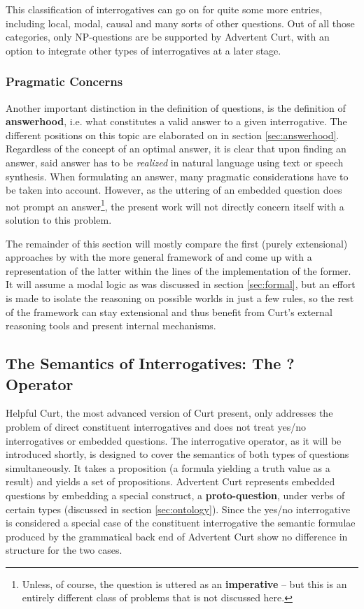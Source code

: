 \documentclass[notitlepage,twoside,a4paper]{scrreprt}
\newcommand{\term}[1]{\textsf{\textbf{#1}}} %
\newcommand{\pn}{\textsf} %
\newcommand{\curt}{\pn{Curt}}
\newcommand{\acurt}{\pn{Advertent Curt}}
\theoremstyle{remark}
\theoremstyle{remark}
\theoremstyle{definition}
\theoremstyle{definition}
\begin{document}
This classification of interrogatives can go on for quite some more entries,
including local, modal, causal and many sorts of other questions. Out of all
those categories, only NP-questions are be supported by \acurt{}, with an option to
integrate other types of interrogatives at a later stage.

\subsubsection{Pragmatic Concerns}

Another important distinction in the definition of questions, is the definition
of \term{answerhood}, i.e. what constitutes a valid answer to a given
interrogative. The different positions on this topic are elaborated on in
section \ref{sec:answerhood}. Regardless of the concept of an optimal answer, it
is clear that upon finding an answer, said answer has to be \emph{realized} in
natural language using text or speech synthesis. When formulating an answer,
many pragmatic considerations have to be taken into account.  However, as the
uttering of an embedded question does not prompt an answer\footnote{Unless, of
course, the question is uttered as an \term{imperative} -- but this is an
entirely different class of problems that is not discussed here.}, the present
work will not directly concern itself with a solution to this problem.

The remainder of this section will mostly compare the first (purely extensional)
approaches by \cite{blackburnbos:cl1} with the more general framework of
\cite{gs:q} and come up with a representation of the latter within the lines of
the implementation of the former. It will assume a modal logic as was discussed
in section \ref{sec:formal}, but an effort is made to isolate the reasoning on
possible worlds in just a few rules, so the rest of the framework can stay
extensional and thus benefit from \curt's external reasoning tools and present
internal mechanisms.

\subsection{The Semantics of Interrogatives: The ? Operator}\label{sec:protoq}

\pn{Helpful Curt}, the most advanced version of \curt{} \cite{blackburnbos:cl1}
present, only addresses the problem of direct constituent interrogatives and
does not treat yes/no interrogatives or embedded questions. The interrogative
operator, as it will be introduced shortly, is designed to cover the semantics
of both types of questions simultaneously. It takes a proposition (a formula
yielding a truth value as a result) and yields a set of propositions. \acurt{}
represents embedded questions by embedding a special construct, a
\term{proto-question}, under verbs of certain types (discussed in section
\ref{sec:ontology}). Since the yes/no interrogative is considered a special case of the
constituent interrogative the semantic formulae produced by the grammatical back
end of \acurt{} show no difference in structure for the two cases.
\end{document}
